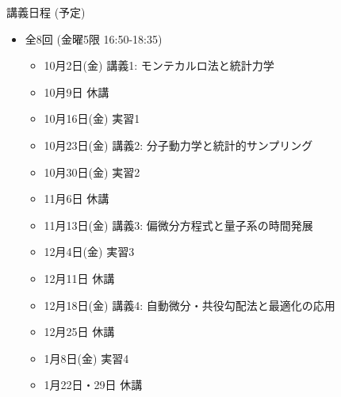 \begin{frame}[t]{講義日程 (予定)}
  \begin{itemize}
  \item 全8回 (金曜5限 16:50-18:35)
    \begin{itemize}
    \item 10月2日(金) 講義1: モンテカルロ法と統計力学
    \item {\color{gray} 10月9日 休講}
    \item 10月16日(金) 実習1
    \item 10月23日(金) 講義2: 分子動力学と統計的サンプリング
    \item 10月30日(金) 実習2
    \item {\color{gray} 11月6日 休講}
    \item 11月13日(金) 講義3: 偏微分方程式と量子系の時間発展
    \item 12月4日(金) 実習3
    \item {\color{gray} 12月11日 休講}
    \item 12月18日(金) 講義4: 自動微分・共役勾配法と最適化の応用
    \item {\color{gray} 12月25日 休講}
    \item 1月8日(金) 実習4
    \item {\color{gray} 1月22日・29日 休講}
    \end{itemize}
  \end{itemize}
\end{frame}
